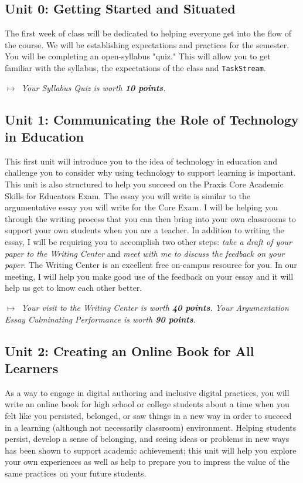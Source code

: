 \documentclass{tufte-handout}
\begin{document}
\subsection{Unit 0: Getting Started and Situated}

The first week of class will be dedicated to helping everyone get into the flow of the course. We will be establishing expectations and practices for the semester. You will be completing an open-syllabus "quiz." This will allow you to get familiar with the syllabus, the expectations of the class and \texttt{TaskStream}.

\medskip\noindent\textit{$\mapsto$~Your Syllabus Quiz is worth \textbf{10 points}.}


\subsection{Unit 1: Communicating the Role of Technology in Education}

This first unit will introduce you to the idea of technology in education and challenge you to consider why using technology to support learning is important. This unit is also structured to help you succeed on the Praxis Core Academic Skills for Educators Exam. The essay you will write is similar to the argumentative essay you will write for the Core Exam. I will be helping you through the writing process that you can then bring into your own classrooms to support your own students when you are a teacher. In addition to writing the essay, I will be requiring you to accomplish two other steps: \textit{take a draft of your paper to the Writing Center} and \textit{meet with me to discuss the feedback on your paper}. The Writing Center is an excellent free on-campus resource for you. In our meeting, I will help you make good use of the feedback on your essay and it will help us get to know each other better.

\medskip\noindent\textit{$\mapsto$~Your visit to the Writing Center is worth \textbf{40 points}. Your Argumentation Essay Culminating Performance is worth \textbf{90 points}.}

\subsection{Unit 2: Creating an Online Book for All Learners}

As a way to engage in digital authoring and inclusive digital practices, you will write an online book for high school or college students about a time when you felt like you persisted, belonged, or saw things in a new way in order to succeed in a learning (although not necessarily classroom) environment. Helping students persist, develop a sense of belonging, and seeing ideas or problems in new ways has been shown to support academic achievement; this unit will help you explore your own experiences as well as help to prepare you to impress the value of the same practices on your future students.
\end{document}
